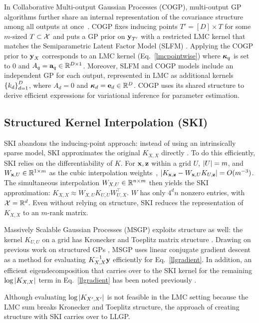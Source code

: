\documentclass{article}
\begin{document}
In Collaborative Multi-output Gaussian Processes (COGP), multi-output GP algorithms further share an internal representation of the covariance structure among all outputs at once~\cite{nguyen2014collaborative}. COGP fixes inducing points ${T'}=[D]\times T$ for some $m$-sized $T\subset \mathcal{X}$ and puts a GP prior on $\textbf{y}_{{T'}}$ with a restricted LMC kernel that matches the Semiparametric Latent Factor Model (SLFM) \cite{seeger2005semiparametric}. Applying the COGP prior to $\textbf{y}_X$ corresponds to an LMC kernel (Eq.~\ref{lmcpointwise}) where ${\boldsymbol\kappa}_q$ is set to 0 and $A_q=\textbf{a}_q\in\mathbb{R}^{D\times 1}$. Moreover, SLFM and COGP models include an independent GP for each output, represented in LMC as additional kernels $\left\{ k_d \right\}_{ d=1 }^{ D }$, where $A_d=0$ and ${\boldsymbol\kappa}_d=\textbf{e}_d\in\mathbb{R}^D$. COGP uses its shared structure to derive efficient expressions for variational inference for parameter estimation.

\subsection{Structured Kernel Interpolation (SKI)}\label{ski-section}

SKI abandons the inducing-point approach: instead of using an intrinsically sparse model, SKI approximates the original $K_{X,X}$ directly \cite{kiss-gp}. To do this efficiently, SKI relies on the differentiability of $K$. For $\textbf{x},\textbf{z}$ within a grid $U$, $\left\vert{U}\right\vert=m$, and $W_{\textbf{x},U}\in\mathbb{R}^{1\times m}$ as the cubic interpolation weights~\cite{keys1981cubic}, $\left|K_{\textbf{x},\textbf{z}}-W_{\textbf{x},U}K_{U,\textbf{z}}\right|=O(m^{-3})$. The simultaneous interpolation $W_{X,U}\in\mathbb{R}^{n\times m}$ then yields the SKI approximation: $K_{X,X}\approx W_{X,U}K_{U,U}W_{U,X}^\top$. $W$ has only $4^dn$ nonzero entries, with $\mathcal{X}=\mathbb{R}^d$. Even without relying on structure, SKI reduces the representation of $K_{X,X}$ to an $m$-rank matrix.

Massively Scalable Gaussian Processes (MSGP) exploits structure as well: the kernel $K_{U,U}$ on a grid has Kronecker and Toeplitz matrix structure \cite{msgp}. Drawing on previous work on structured GPs \cite{cunningham2008fast, gilboa2015scaling}, MSGP uses linear conjugate gradient descent as a method for evaluating $K_{X,X}^{-1}\textbf{y}$ efficiently for Eq.~\ref{llgradient}. In addition, an efficient eigendecomposition that carries over to the SKI kernel for the remaining $\log\left|K_{X,X}\right|$ term in Eq.~\ref{llgradient} has been noted previously \cite{wilson2014fast}.

Although evaluating $\log\left|K_{X',X'}\right|$ is not feasible in the LMC setting because the LMC sum breaks Kronecker and Toeplitz structure, the approach of creating structure with SKI carries over to LLGP.
\end{document}
